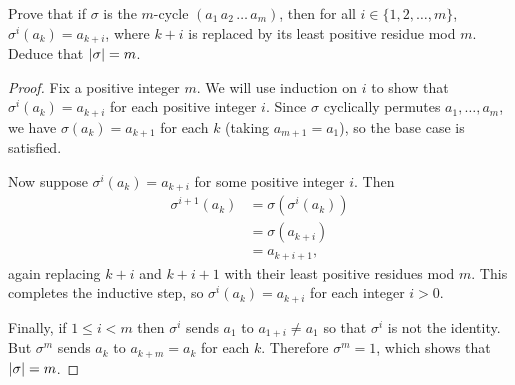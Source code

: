  Prove that if $\sigma$ is the $m$-cycle
$(a_1\,a_2\,\dots\,a_m)$, then for all $i\in\{1,2,\dots,m\}$,
$\sigma^i(a_k) = a_{k+i}$, where $k+i$ is replaced by its least
positive residue mod $m$. Deduce that $\lvert{\sigma}\rvert = m$.
\begin{proof}
  Fix a positive integer $m$. We will use induction on $i$ to show
  that $\sigma^i(a_k) = a_{k+i}$ for each positive integer $i$. Since
  $\sigma$ cyclically permutes $a_1,\dots,a_m$, we have
  $\sigma(a_k) = a_{k+1}$ for each $k$ (taking $a_{m+1} = a_1$), so
  the base case is satisfied.

  Now suppose $\sigma^i(a_k) = a_{k+i}$ for some positive integer
  $i$. Then
  \begin{align*}
    \sigma^{i+1}(a_k) &= \sigma(\sigma^i(a_k)) \\
                      &= \sigma(a_{k+i}) \\
                      &= a_{k+i+1},
  \end{align*}
  again replacing $k+i$ and $k+i+1$ with their least positive residues
  mod $m$. This completes the inductive step, so
  $\sigma^i(a_k) = a_{k+i}$ for each integer $i > 0$.

  Finally, if $1\leq i<m$ then $\sigma^i$ sends $a_1$ to
  $a_{1+i}\neq a_1$ so that $\sigma^i$ is not the identity. But
  $\sigma^m$ sends $a_k$ to $a_{k+m} = a_k$ for each $k$. Therefore
  $\sigma^m = 1$, which shows that $\lvert{\sigma}\rvert = m$.
\end{proof}
